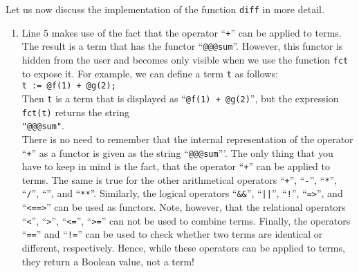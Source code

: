 Let us now discuss the implementation of the function \texttt{diff} in more detail.  
\begin{enumerate}
\item Line 5 makes use of the fact that the operator ``\texttt{+}'' can be applied to terms.
      The result is a term that has the functor ``\texttt{@@@sum}''.  However, this functor is hidden from the
      user and becomes only visible when we use the function \texttt{fct} to expose it.  For example, we can
      define a term \texttt{t} as follows:
      \\[0.2cm]
      \hspace*{1.3cm}
      \texttt{t := @f(1) + @g(2);}
      \\[0.2cm]
      Then \texttt{t} is a term that is displayed as ``\texttt{@f(1) + @g(2)}'', but the expression
      \texttt{fct(t)} returns the string
      \\[0.2cm]
      \hspace*{1.3cm}
      \texttt{"@@@sum"}.
      \\[0.2cm]
      There is no need to remember that the internal representation of the operator ``\texttt{+}'' as a functor
      is given as the string ``\texttt{@@@sum}'''.  The only thing that you have to keep in mind is
      the fact, that the operator ``\texttt{+}'' can be applied to terms.  The same is true for the
      other arithmetical operators ``\texttt{+}'', ``\texttt{-}'', ``\texttt{*}'', ``\texttt{/}'',
      ``\texttt{}'', and ``\texttt{**}''.  Similarly, the logical operators
      ``\texttt{\&\&}'', ``\texttt{||}'', ``\texttt{!}'', ``\texttt{=>}'', and ``\texttt{<==>}'' can
      be used as functors.  Note, however, that the relational operators ``\texttt{<}'',
      ``\texttt{>}'', ``\texttt{<=}'', ``\texttt{>=}'' \colorbox{amethyst}{can not be used} to
      combine terms.  Finally, the operators ``\texttt{==}'' and ``\texttt{!=}'' can be used to
      check whether two terms are identical or different, respectively.  Hence, while these
      operators can be applied to terms, they return a Boolean value, not a term!
      

\end{enumerate}

